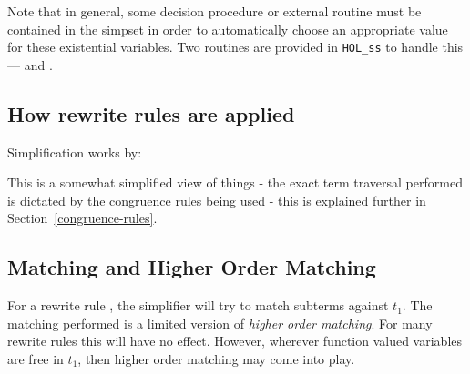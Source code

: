 \documentclass[a4]{article}
\begin{document}
Note that in general, some decision procedure or external routine must
be contained in the simpset in order to automatically choose an
appropriate value for these existential variables.  Two routines are
provided in {\tt HOL\_ss} to handle this ---  and
.

\subsection{How rewrite rules are applied}

Simplification works by:

This is a somewhat simplified view of things - the exact term traversal
performed is dictated by the congruence rules being used - this is
explained further in Section~\ref{congruence-rules}.


\subsection{Matching and Higher Order Matching}

For a rewrite rule ,
the simplifier will try to match subterms against $t_1$.  The
matching performed is a limited version of {\it higher order
matching}.  For many rewrite rules this will have no effect.  However,
wherever function valued variables are free in $t_1$, then higher
order matching may come into play.
\end{document}

